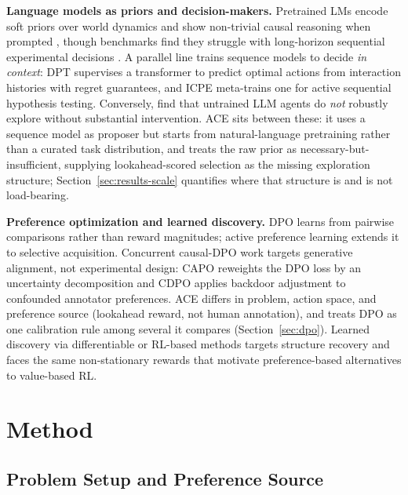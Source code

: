 \documentclass[twoside]{article}
\theoremstyle{plain}
\theoremstyle{definition}
\theoremstyle{remark}
\begin{document}
\textbf{Language models as priors and decision-makers.} Pretrained LMs encode soft priors over world dynamics \citep{hao2023reasoning,xie2022explanation} and show non-trivial causal reasoning when prompted \citep{kiciman2023causal}, though benchmarks find they struggle with long-horizon sequential experimental decisions \citep{llm_science_survey2025,boxinggym2025,autobench2025}. A parallel line trains sequence models to decide \emph{in context}: DPT \citep{lee2023supervised} supervises a transformer to predict optimal actions from interaction histories with regret guarantees, and ICPE \citep{russo2025incontext} meta-trains one for active sequential hypothesis testing. Conversely, \citet{krishnamurthy2024explore} find that untrained LLM agents do \emph{not} robustly explore without substantial intervention. ACE sits between these: it uses a sequence model as proposer but starts from natural-language pretraining rather than a curated task distribution, and treats the raw prior as necessary-but-insufficient, supplying lookahead-scored selection as the missing exploration structure; Section~\ref{sec:results-scale} quantifies where that structure is and is not load-bearing.

\textbf{Preference optimization and learned discovery.} DPO \citep{rafailov2023direct} learns from pairwise comparisons rather than reward magnitudes; active preference learning \citep{activedpo2024} extends it to selective acquisition. Concurrent causal-DPO work targets generative alignment, not experimental design: CAPO \citep{hu2026capo} reweights the DPO loss by an uncertainty decomposition and CDPO \citep{le2026cdpo} applies backdoor adjustment to confounded annotator preferences. ACE differs in problem, action space, and preference source (lookahead reward, not human annotation), and treats DPO as one calibration rule among several it compares (Section~\ref{sec:dpo}). Learned discovery via differentiable \citep{lorch2021dibs} or RL-based \citep{core2024,gacbo2024} methods targets structure recovery and faces the same non-stationary rewards that motivate preference-based alternatives to value-based RL.

\section{Method}
\label{sec:methods}

\subsection{Problem Setup and Preference Source}
\label{sec:problem}
\end{document}
